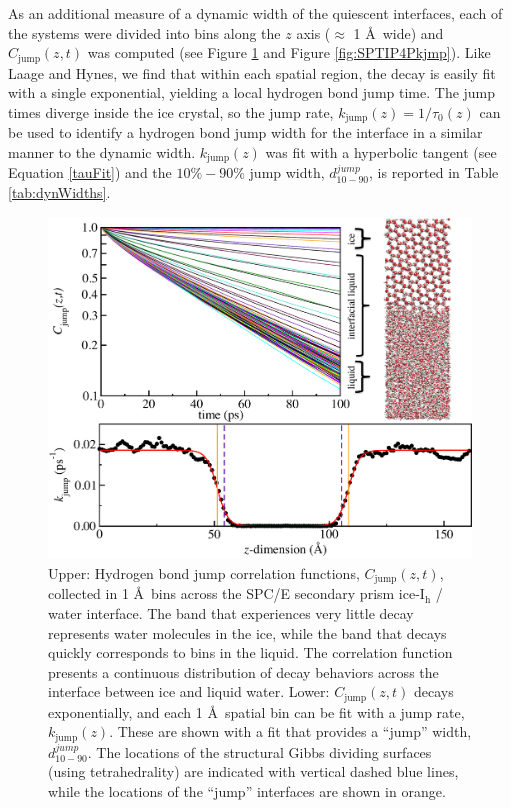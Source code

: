 As an additional measure of a dynamic width of the quiescent
interfaces, each of the systems were divided into bins along the $z$
axis ($\approx$ 1 \AA\ wide) and $C_\mathrm{jump}(z,t)$ was computed
(see Figure \ref{fig:SPkjmp} and Figure \ref{fig:SPTIP4Pkjmp}).
Like Laage and Hynes, we find that within each spatial region, the
decay is easily fit with a single exponential, yielding a local
hydrogen bond jump time. The jump times diverge inside the ice
crystal, so the jump rate, $k_\mathrm{jump}(z) = 1 / \tau_0(z)$ can be
used to identify a hydrogen bond jump width for the interface in a
similar manner to the dynamic width. $k_\mathrm{jump}(z)$ was fit with
a hyperbolic tangent (see Equation \eqref{tauFit}) and the $10\%-90\%$ jump
width, $d_\mathrm{10-90}^{jump}$, is reported in Table \ref{tab:dynWidths}.

\begin{figure}
\includegraphics[width=5.5in]{Figures/secPrismJumpPlot}
\caption{\label{fig:SPkjmp} Upper: Hydrogen bond jump correlation
  functions, $C_\mathrm{jump}(z,t)$, collected in 1 \AA~bins across
  the SPC/E secondary prism ice-I$_\mathrm{h}$ / water interface. The band that
  experiences very little decay represents water molecules in the ice,
  while the band that decays quickly corresponds to bins in the
  liquid.  The correlation function presents a continuous distribution
  of decay behaviors across the interface between ice and liquid
  water.  Lower: $C_\mathrm{jump}(z,t)$ decays exponentially, and each
  1 \AA~spatial bin can be fit with a jump rate, $k_\mathrm{jump}(z)$.
  These are shown with a fit that provides a ``jump'' width,
  $d_\mathrm{10-90}^{jump}$. The locations of the structural Gibbs dividing
  surfaces (using tetrahedrality) are indicated with vertical dashed
  blue lines, while the locations of the ``jump'' interfaces are shown in
  orange.}
\end{figure}


